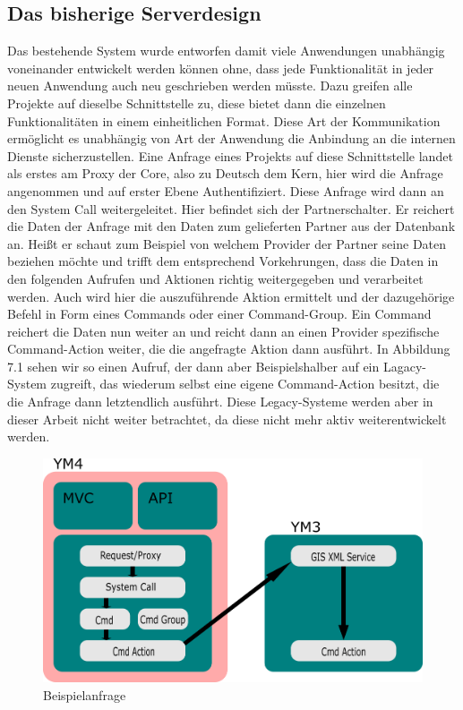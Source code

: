 \documentclass[12pt,a4paper]{scrartcl}
\begin{document}
\subsection{Das bisherige Serverdesign}
Das bestehende System wurde entworfen damit viele Anwendungen unabhängig voneinander entwickelt werden können ohne, dass jede Funktionalität in jeder neuen Anwendung auch neu geschrieben werden müsste. Dazu greifen alle Projekte auf dieselbe Schnittstelle zu, diese bietet dann die einzelnen Funktionalitäten in einem einheitlichen Format. Diese Art der Kommunikation ermöglicht es unabhängig von Art der Anwendung die Anbindung an die internen Dienste sicherzustellen. Eine Anfrage eines Projekts auf diese Schnittstelle landet als erstes am Proxy der Core, also zu Deutsch dem Kern, hier wird die Anfrage angenommen und auf erster Ebene Authentifiziert. Diese Anfrage wird dann an den System Call weitergeleitet. Hier befindet sich der Partnerschalter. Er reichert die Daten der Anfrage mit den Daten zum gelieferten Partner aus der Datenbank an. Heißt er schaut zum Beispiel von welchem Provider der Partner seine Daten beziehen möchte und trifft dem entsprechend Vorkehrungen, dass die Daten in den folgenden Aufrufen und Aktionen richtig weitergegeben und verarbeitet werden. Auch wird hier die auszuführende Aktion ermittelt und der dazugehörige Befehl in Form eines Commands oder einer Command-Group. Ein Command reichert die Daten nun weiter an und reicht dann an einen Provider spezifische Command-Action weiter, die die angefragte Aktion dann ausführt. In Abbildung 7.1 sehen wir so einen Aufruf, der dann aber Beispielshalber auf ein Lagacy-System zugreift, das wiederum selbst eine eigene Command-Action besitzt, die die Anfrage dann letztendlich ausführt. Diese Legacy-Systeme werden aber in dieser Arbeit nicht weiter betrachtet, da diese nicht mehr aktiv weiterentwickelt werden.

\begin{figure}[h!]
	\centering
	\includegraphics[scale=2]{YmSysReq.png}
	\caption[Selbst erstellte Grafik]{Beispielanfrage}
\end{figure}
\end{document}
